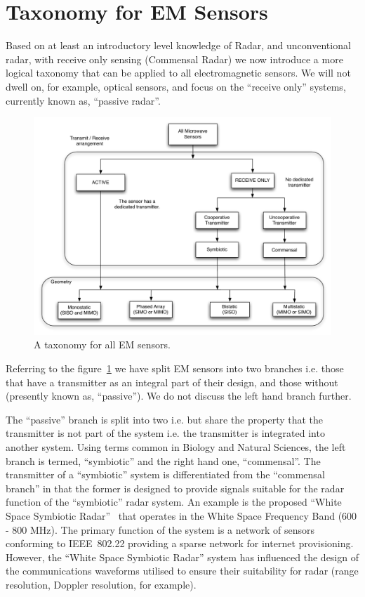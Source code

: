 \documentclass[english, 12pt]{report}
\begin{document}
\section{Taxonomy for EM Sensors}


Based on at least an introductory level knowledge of Radar, and unconventional radar, with receive only sensing (Commensal Radar) we now introduce a more logical taxonomy that can be applied to all electromagnetic sensors. We will not dwell on, for example, optical sensors, and focus on the ``receive only'' systems, currently known as, ``passive radar''.

\begin{figure}[htbp]
\begin{center}
\includegraphics[width=\textwidth, angle=90]{figs/tree_4}
\caption{A taxonomy for all EM sensors.}
\label{fig:tax}
\end{center}
\end{figure}


Referring to the figure~\ref{fig:tax} we have split EM sensors into two branches i.e. those that have a transmitter as an integral part of their design, and those without (presently known as, ``passive''). We do not discuss the left hand branch further.

The ``passive'' branch is split into two i.e. but share the property that the transmitter is not part of the system i.e. the transmitter is integrated into another system. Using terms common in Biology and Natural Sciences, the left branch is termed, ``symbiotic'' and the right hand one, ``commensal''. The transmitter of a ``symbiotic'' system is differentiated from the ``commensal branch'' in that the former is designed to provide signals suitable for the radar function of the ``symbiotic'' radar system. An example is the proposed ``White Space Symbiotic Radar''~\cite{inggs:14j} that operates in the White Space Frequency Band (600 - 800 MHz). The primary function of the system is a network of sensors conforming to IEEE~802.22 providing a sparse network for internet provisioning. However, the ``White Space Symbiotic Radar'' system has influenced the design of the communications waveforms utilised to ensure their suitability for radar (range resolution, Doppler resolution, for example). 
\end{document}
